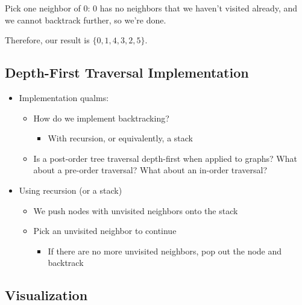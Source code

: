 \documentclass[
  10pt,
  english,
  letterpaper,
,tablecaptionabove
]{scrartcl}
\providecommand{\tightlist}{%
  \setlength{\itemsep}{0pt}\setlength{\parskip}{0pt}}
\begin{document}
Pick one neighbor of \(0\): \(0\) has no neighbors that we haven't
visited already, and we cannot backtrack further, so we're done.

Therefore, our result is \(\{0, 1, 4, 3, 2, 5\}\).

\hypertarget{depth-first-traversal-implementation}{%
\subsection{Depth-First Traversal
Implementation}\label{depth-first-traversal-implementation}}

\begin{itemize}
\tightlist
\item
  Implementation qualms:

  \begin{itemize}
  \tightlist
  \item
    How do we implement backtracking?

    \begin{itemize}
    \tightlist
    \item
      With recursion, or equivalently, a stack
    \end{itemize}
  \item
    Is a post-order tree traversal depth-first when applied to graphs?
    What about a pre-order traversal? What about an in-order traversal?
  \end{itemize}
\item
  Using recursion (or a stack)

  \begin{itemize}
  \tightlist
  \item
    We push nodes with unvisited neighbors onto the stack
  \item
    Pick an unvisited neighbor to continue

    \begin{itemize}
    \tightlist
    \item
      If there are no more unvisited neighbors, pop out the node and
      backtrack
    \end{itemize}
  \end{itemize}
\end{itemize}

\hypertarget{visualization}{%
\subsection{Visualization}\label{visualization}}
\end{document}
